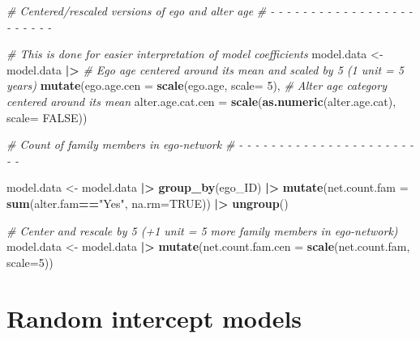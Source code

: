 \documentclass[
]{book}
\newenvironment{Shaded}{\begin{snugshade}}{\end{snugshade}}
\newcommand{\AttributeTok}[1]{\textcolor[rgb]{0.13,0.29,0.53}{#1}}
\newcommand{\CommentTok}[1]{\textcolor[rgb]{0.56,0.35,0.01}{\textit{#1}}}
\newcommand{\ConstantTok}[1]{\textcolor[rgb]{0.56,0.35,0.01}{#1}}
\newcommand{\DecValTok}[1]{\textcolor[rgb]{0.00,0.00,0.81}{#1}}
\newcommand{\FunctionTok}[1]{\textcolor[rgb]{0.13,0.29,0.53}{\textbf{#1}}}
\newcommand{\NormalTok}[1]{#1}
\newcommand{\OtherTok}[1]{\textcolor[rgb]{0.56,0.35,0.01}{#1}}
\newcommand{\SpecialCharTok}[1]{\textcolor[rgb]{0.81,0.36,0.00}{\textbf{#1}}}
\newcommand{\StringTok}[1]{\textcolor[rgb]{0.31,0.60,0.02}{#1}}
\begin{document}
\begin{Shaded}
\begin{Highlighting}[]
\CommentTok{\# Centered/rescaled versions of ego and alter age }
\CommentTok{\# {-} {-} {-} {-} {-} {-} {-} {-} {-} {-} {-} {-} {-} {-} {-} {-} {-} {-} {-} {-} {-} {-} {-} {-} }

\CommentTok{\# This is done for easier interpretation of model coefficients}
\NormalTok{model.data }\OtherTok{\textless{}{-}}\NormalTok{ model.data }\SpecialCharTok{|\textgreater{}} 
  \CommentTok{\# Ego age centered around its mean and scaled by 5 (1 unit = 5 years)}
  \FunctionTok{mutate}\NormalTok{(}\AttributeTok{ego.age.cen =} \FunctionTok{scale}\NormalTok{(ego.age, }\AttributeTok{scale=} \DecValTok{5}\NormalTok{),}
         \CommentTok{\# Alter age category centered around its mean}
         \AttributeTok{alter.age.cat.cen =} \FunctionTok{scale}\NormalTok{(}\FunctionTok{as.numeric}\NormalTok{(alter.age.cat), }\AttributeTok{scale=} \ConstantTok{FALSE}\NormalTok{))}

\CommentTok{\# Count of family members in ego{-}network}
\CommentTok{\# {-} {-} {-} {-} {-} {-} {-} {-} {-} {-} {-} {-} {-} {-} {-} {-} {-} {-} {-} {-} {-} {-} {-} {-} }

\NormalTok{model.data }\OtherTok{\textless{}{-}}\NormalTok{ model.data }\SpecialCharTok{|\textgreater{}} 
  \FunctionTok{group\_by}\NormalTok{(ego\_ID) }\SpecialCharTok{|\textgreater{}}
  \FunctionTok{mutate}\NormalTok{(}\AttributeTok{net.count.fam =} \FunctionTok{sum}\NormalTok{(alter.fam}\SpecialCharTok{==}\StringTok{"Yes"}\NormalTok{, }\AttributeTok{na.rm=}\ConstantTok{TRUE}\NormalTok{)) }\SpecialCharTok{|\textgreater{}}
  \FunctionTok{ungroup}\NormalTok{()}

\CommentTok{\# Center and rescale by 5 (+1 unit = 5 more family members in ego{-}network)}
\NormalTok{model.data }\OtherTok{\textless{}{-}}\NormalTok{ model.data }\SpecialCharTok{|\textgreater{}} 
  \FunctionTok{mutate}\NormalTok{(}\AttributeTok{net.count.fam.cen =} \FunctionTok{scale}\NormalTok{(net.count.fam, }\AttributeTok{scale=}\DecValTok{5}\NormalTok{)) }
\end{Highlighting}
\end{Shaded}

\hypertarget{random-intercept-models}{%
\section{Random intercept models}\label{random-intercept-models}}
\end{document}
